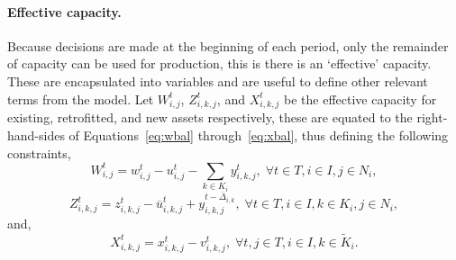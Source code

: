 \documentclass{amsart}
\begin{document}
\smallskip
%
\paragraph{Effective capacity.}
Because decisions are made at the beginning of each period, only the remainder
of capacity can be used for production, this is there is an `effective'
capacity. These are encapsulated into variables and are
useful to define other relevant terms from the model. 
Let $W^t_{i,j}$, $Z^t_{i,k,j}$, and $X^t_{i,k,j}$ be the effective capacity for
existing, retrofitted, and new assets respectively, these are equated to the
right-hand-sides of Equations~\eqref{eq:wbal} through~\eqref{eq:xbal}, thus
defining the following constraints, 
\begin{equation}
  W^t_{i,j} = w^{t}_{i,j} - u^{t}_{i,j} - \sum_{k \in K_i} y^{t}_{i, k,j}, 
  \; \forall t \in T, i \in I, j \in N_i,
\label{eq:weff}
\end{equation}
%
\begin{equation}
    Z^t_{i,k,j} = z^{t}_{i,k,j} - \overline{u}^t_{i,k,j} + 
    y^{t-\overline{\Delta}_{i,k}}_{i,k,j},\;
    \forall 
    t \in T, i \in I, k \in K_i, j \in N_i,
\end{equation}
%
and,
%
\begin{equation}
    X^t_{i,k,j} = x^{t}_{i,k,j} - v^t_{i,k,j} 
    ,\; \forall 
    t,j \in T, i \in I, k \in \tilde{K}_i.
\end{equation}
%
\end{document}
